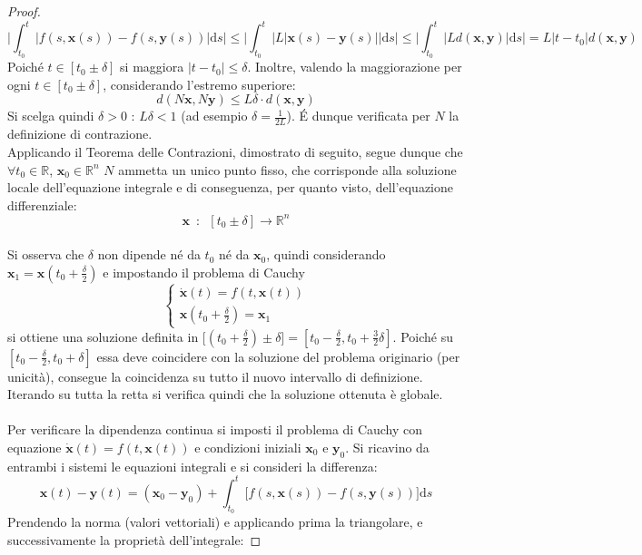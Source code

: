 \documentclass[10pt]{article}
\theoremstyle{plain}
\begin{document}
\begin{proof}
\[\bigg|\int_{t_0}^{t}\big| f(s, \mathbf{x}(s)) - f(s, \mathbf{y}(s)) \big|\textrm{d}s\bigg| \leq \bigg|\int_{t_0}^{t}\big| L |\mathbf{x}(s) - \mathbf{y}(s)| \big|\textrm{d}s\bigg| \leq \bigg|\int_{t_0}^{t}\big| L d(\mathbf{x},\mathbf{y}) \big|\textrm{d}s\bigg| = L |t - t_0| d(\mathbf{x}, \mathbf{y})\]
Poiché $t \in [t_0 \pm \delta]$ si maggiora $|t-t_0| \leq \delta$. Inoltre, valendo la maggiorazione per ogni $t \in [t_0 \pm \delta]$, considerando l'estremo superiore:
\[d(N \mathbf{x}, N \mathbf{y}) \leq L \delta \cdot d(\mathbf{x}, \mathbf{y})\]
Si scelga quindi $\delta > 0$ : $L \delta < 1$ (ad esempio $\displaystyle \delta = \frac{1}{2L}$). \'E dunque verificata per $N$ la definizione di contrazione.
\\Applicando il Teorema delle Contrazioni, dimostrato di seguito, segue dunque che $\forall t_0 \in \mathbb{R}$, $\mathbf{x}_0 \in \mathbb{R}^n$ $N$ ammetta un unico punto fisso, che corrisponde alla soluzione locale dell'equazione integrale e di conseguenza, per quanto visto, dell'equazione differenziale:
\[\mathbf{x} \enspace : \enspace [t_0 \pm \delta] \longrightarrow \mathbb{R}^n\]
\\Si osserva che $\delta$ non dipende né da $t_0$ né da $\mathbf{x}_0$, quindi considerando $\displaystyle \mathbf{x}_1 = \mathbf{x}(t_0 + \frac{\delta}{2})$ e impostando il problema di Cauchy
\[\begin{cases}
\dot{\mathbf{x}}(t) = f(t, \mathbf{x}(t))\\
\mathbf{x}(t_0 + \frac{\delta}{2}) = \mathbf{x}_1
\end{cases}\] 
si ottiene una soluzione definita in $\displaystyle \big[(t_0 + \frac{\delta}{2}) \pm \delta\big] = [t_0 - \frac{\delta}{2}, t_0 + \frac{3}{2}\delta]$. Poiché su $[t_0 - \frac{\delta}{2}, t_0 + \delta]$ essa deve coincidere con la soluzione del problema originario (per unicità), consegue la coincidenza su tutto il nuovo intervallo di definizione. Iterando su tutta la retta si verifica quindi che la soluzione ottenuta è globale.
\\~\\Per verificare la dipendenza continua si imposti il problema di Cauchy con equazione $\dot{\mathbf{x}}(t) = f(t, \mathbf{x}(t))$ e condizioni iniziali $\mathbf{x}_0$ e $\mathbf{y}_0$. Si ricavino da entrambi i sistemi le equazioni integrali e si consideri la differenza:
\[\mathbf{x}(t) - \mathbf{y}(t) = (\mathbf{x}_0 - \mathbf{y}_0) + \int_{t_0}^{t}\big[f(s, \mathbf{x}(s)) - f(s, \mathbf{y}(s))\big]\textrm{d}s\]
Prendendo la norma (valori vettoriali) e applicando prima la triangolare, e successivamente la proprietà dell'integrale:

\end{proof}
\end{document}
